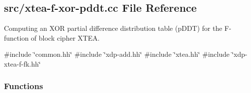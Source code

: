 \hypertarget{xtea-f-xor-pddt_8cc}{\subsection{src/xtea-\/f-\/xor-\/pddt.cc \-File \-Reference}
\label{xtea-f-xor-pddt_8cc}
}


\-Computing an \-X\-O\-R partial difference distribution table (p\-D\-D\-T) for the \-F-\/function of block cipher \-X\-T\-E\-A.  


{\ttfamily \#include \char`\"{}common.\-hh\char`\"{}}\*
{\ttfamily \#include \char`\"{}xdp-\/add.\-hh\char`\"{}}\*
{\ttfamily \#include \char`\"{}xtea.\-hh\char`\"{}}\*
{\ttfamily \#include \char`\"{}xdp-\/xtea-\/f-\/fk.\-hh\char`\"{}}\*
\subsubsection*{\-Functions}
